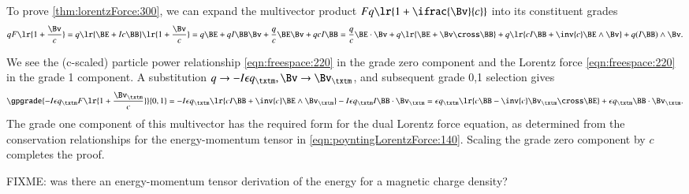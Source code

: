 To prove 
\cref{thm:lorentzForce:300},
we can expand the multivector product
\( F q \lr{ 1 + \ifrac{\Bv}{c} } \) into its constituent grades
\begin{dmath}\label{eqn:lorentzForce:40}
q F \lr{ 1 + \frac{\Bv}{c} }
=
q
\lr{ \BE + I c \BB }
\lr{ 1 + \frac{\Bv}{c} }
=
q \BE
+ q I \BB \Bv
+ \frac{q}{c} \BE \Bv
+ q c I \BB
=
  \frac{q}{c} \BE \cdot \Bv
+ q \lr{ \BE + \Bv \cross \BB }
+ q \lr{ c I \BB + \inv{c} \BE \wedge \Bv }
+ q (I \BB) \wedge \Bv.
\end{dmath}

We see the (c-scaled) particle power relationship
\cref{eqn:freespace:220}
in the grade zero component and the Lorentz force \cref{eqn:freespace:220} in the grade 1 component.
A substitution \( q \rightarrow -I \epsilon q_\txtm, \Bv \rightarrow \Bv_\txtm \), and subsequent grade 0,1 selection gives
\begin{dmath}\label{eqn:lorentzForce:320}
\gpgrade{
-I \epsilon q_\txtm F \lr{ 1 + \frac{\Bv_\txtm}{c} }
}{0,1}
=
- I \epsilon q_\txtm \lr{ c I \BB + \inv{c} \BE \wedge \Bv_\txtm }
- I \epsilon q_\txtm I \BB \cdot \Bv_\txtm
=
\epsilon q_\txtm \lr{ c \BB - \inv{c} \Bv_\txtm \cross \BE }
+
\epsilon q_\txtm \BB \cdot \Bv_\txtm.
\end{dmath}
The grade one component of this multivector has the
required form for the dual Lorentz force equation, as determined from the conservation relationships for the energy-momentum tensor in
\cref{eqn:poyntingLorentzForce:140}.
Scaling the grade zero component by \( c \) completes the proof.

FIXME: was there an energy-momentum tensor derivation of the energy for a magnetic charge density?

